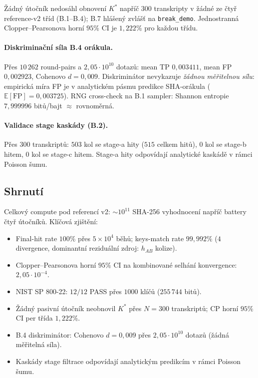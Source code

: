 \documentclass[11pt,a4paper]{article}
\begin{document}
Žádný útočník nedosáhl obnovení $K^*$ napříč $300$ transkripty v žádné ze čtyř reference-v2 tříd (B.1--B.4); B.7 hlášený zvlášť na \texttt{break\_demo}. Jednostranná Clopper--Pearsonova horní $95\%$ CI je $1{,}222\%$ pro každou třídu.

\paragraph{Diskriminační síla B.4 orákula.} Přes $10\,262$ round-pairs a $2{,}05 \cdot 10^{10}$ dotazů: mean TP $0{,}003411$, mean FP $0{,}002923$, Cohenovo $d = 0{,}009$. Diskriminátor nevykazuje \emph{žádnou měřitelnou sílu}: empirická míra FP je v analytickém pásmu predikce SHA-orákula ($\mathbb{E}[\text{FP}] = 0{,}003725$). RNG cross-check na B.1 sampler: Shannon entropie $7{,}999996$ bitů/bajt $\approx$ rovnoměrná.

\paragraph{Validace stage kaskády (B.2).} Přes $300$ transkriptů: $503$ kol se stage-a hity ($515$ celkem hitů), $0$ kol se stage-b hitem, $0$ kol se stage-c hitem. Stage-a hity odpovídají analytické kaskádě v rámci Poisson šumu.

\subsection{Shrnutí}

Celkový compute pod referencí v2: $\sim 10^{11}$ SHA-256 vyhodnocení napříč battery čtyř útočníků. Klíčová zjištění:

\begin{itemize}[leftmargin=*]
\item Final-hit rate $100\%$ přes $5 \times 10^4$ běhů; keys-match rate $99{,}992\%$ ($4$ divergence, dominantní reziduální zdroj: $h_{AB}$ kolize).
\item Clopper--Pearsonova horní $95\%$ CI na kombinované selhání konvergence: $2{,}05 \cdot 10^{-4}$.
\item NIST SP 800-22: $12/12$ PASS přes $1000$ klíčů ($255\,744$ bitů).
\item Žádný pasivní útočník neobnovil $K^*$ přes $N = 300$ transkriptů; CP horní $95\%$ CI per třída $1{,}222\%$.
\item B.4 diskriminátor: Cohenovo $d = 0{,}009$ přes $2{,}05 \cdot 10^{10}$ dotazů (žádná měřitelná síla).
\item Kaskády stage filtrace odpovídají analytickým predikcím v rámci Poisson šumu.
\end{itemize}
\end{document}
